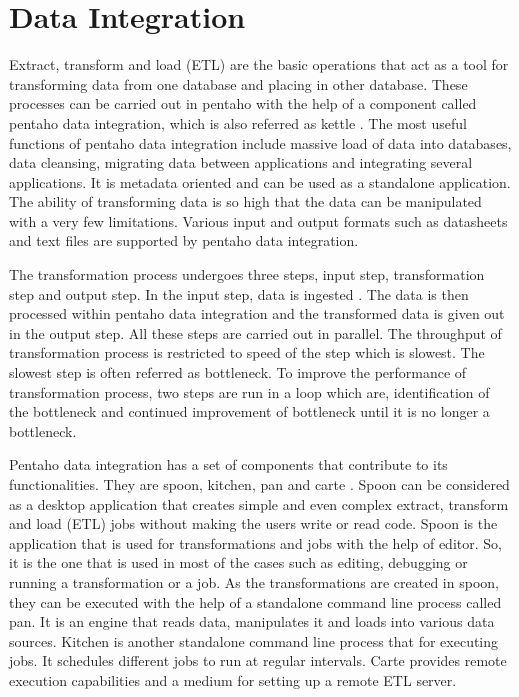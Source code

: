 \documentclass[9pt,twocolumn,twoside]{../../styles/osajnl}
\begin{document}
\section{Data Integration}

Extract, transform and load (ETL) are the basic operations that act as
a tool for transforming data from one database and placing in other
database. These processes can be carried out in pentaho with the help
of a component called pentaho data integration, which is also referred
as kettle \cite{pent4}. The most useful functions of pentaho data
integration include massive load of data into databases, data
cleansing, migrating data between applications and integrating several
applications. It is metadata oriented and can be used as a standalone
application. The ability of transforming data is so high that the data
can be manipulated with a very few limitations. Various input and
output formats such as datasheets and text files are supported by
pentaho data integration.

The transformation process undergoes three steps, input step,
transformation step and output step. In the input step, data is
ingested \cite{pent5}. The data is then processed within pentaho data
integration and the transformed data is given out in the output
step. All these steps are carried out in parallel. The throughput of
transformation process is restricted to speed of the step which is
slowest. The slowest step is often referred as bottleneck. To improve
the performance of transformation process, two steps are run in a loop
which are, identification of the bottleneck and continued improvement
of bottleneck until it is no longer a bottleneck.

Pentaho data integration has a set of components that contribute to
its functionalities. They are spoon, kitchen, pan and carte
\cite{pent6}. Spoon can be considered as a desktop application that
creates simple and even complex extract, transform and load (ETL) jobs
without making the users write or read code. Spoon is the application
that is used for transformations and jobs with the help of editor. So,
it is the one that is used in most of the cases such as editing,
debugging or running a transformation or a job. As the transformations
are created in spoon, they can be executed with the help of a
standalone command line process called pan. It is an engine that reads
data, manipulates it and loads into various data sources. Kitchen is
another standalone command line process that for executing jobs. It
schedules different jobs to run at regular intervals. Carte provides
remote execution capabilities and a medium for setting up a remote ETL
server.
\end{document}
